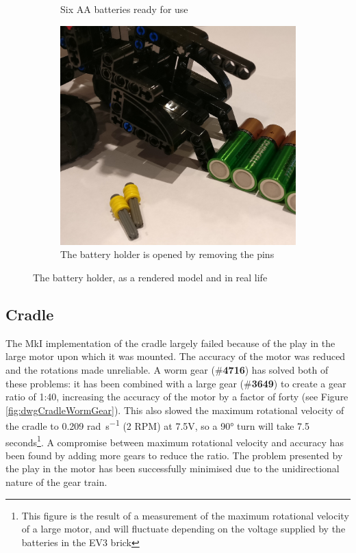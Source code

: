 \documentclass{report}
\newcommand{\tbo}[1]{\textbf{#1}}
\newcommand{\legopiece}[1]{(\#\tbo{#1})}
\begin{document}
\begin{figure}[H]
\begin{subfigure}[b]{0.21082\textwidth}
			\caption{Six AA batteries ready for use}
			\label{fig:imgBatteryHolder}
		\end{subfigure}
		\hspace{10mm}
		\begin{subfigure}[b]{0.26253\textwidth}
			\includegraphics[width=\textwidth]{Resources/Images/imgBatteryHolderOpen.jpg}
			\caption{The battery holder is opened by removing the pins}
			\label{fig:imgBatteryHolderOpen}
		\end{subfigure}
		\caption{The battery holder, as a rendered model and in real life}
		\label{fig:batteryHolder}
	\end{figure}
	
	\subsection{Cradle}

	The MkI implementation of the cradle largely failed because of the play in the large motor upon which it was mounted. The accuracy of the motor was reduced and the rotations made unreliable. A worm gear \legopiece{4716} has solved both of these problems: it has been combined with a large gear \legopiece{3649} to create a gear ratio of 1:40, increasing the accuracy of the motor by a factor of forty (see Figure \ref{fig:dwgCradleWormGear}). This also slowed the maximum rotational velocity of the cradle to 0.209 \si{\radian\per\second} (2 RPM) at 7.5\si{\volt}, so a \ang{90} turn will take 7.5 seconds\footnote{This figure is the result of a measurement of the maximum rotational velocity of a large motor, and will fluctuate depending on the voltage supplied by the batteries in the EV3 brick}. A compromise between maximum rotational velocity and accuracy has been found by adding more gears to reduce the ratio. The problem presented by the play in the motor has been successfully minimised due to the unidirectional nature of the gear train.
	
\end{document}
